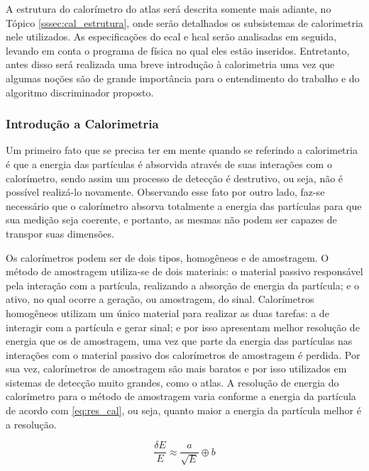A estrutura do calorímetro do \gls{atlas} será descrita somente mais adiante, no Tópico
\ref{sssec:cal_estrutura}, onde serão detalhados os subsistemas de calorimetria
nele utilizados. As especificações do \gls{ecal} e \gls{hcal} serão analisadas em seguida, 
levando em conta o programa de física no qual eles estão inseridos. 
Entretanto, antes disso será realizada uma breve introdução à
calorimetria uma vez que algumas noções são de grande importância para o 
entendimento do trabalho e do algoritmo discriminador proposto.

\subsubsection{Introdução a Calorimetria}
\label{sssec:intro_cal}

Um primeiro fato que se precisa ter em mente quando se referindo a calorimetria
\cite{wigmans,tese_torres} é que a energia das partículas é 
absorvida através de suas interações com o calorímetro, sendo assim um processo 
de detecção é destrutivo, ou seja, não é possível realizá-lo novamente. 
Observando esse fato por outro lado, faz-se necessário que o calorímetro 
absorva totalmente a energia das partículas para que sua medição 
seja coerente, e portanto, as mesmas não podem ser capazes de transpor suas dimensões.

Os calorímetros podem ser de dois tipos, homogêneos e de amostragem. 
O método de amostragem utiliza-se de dois materiais: o material passivo 
responsável pela interação com a partícula, realizando a absorção de energia da
partícula; e o ativo, no qual ocorre a geração, ou amostragem, do sinal. 
Calorímetros homogêneos utilizam um único material para realizar as duas
tarefas: a de interagir com a partícula e gerar sinal; e por isso apresentam melhor resolução de energia 
que os de amostragem, uma vez que parte da energia das partículas nas interações com o
material passivo dos calorímetros de amostragem é perdida. Por sua vez, calorímetros de amostragem são
mais baratos e por isso utilizados em sistemas de detecção muito grandes, como o
\gls{atlas}. A resolução de energia do calorímetro para o método de 
amostragem varia conforme a energia da partícula de acordo com
\ref{eq:res_cal}, ou seja, quanto maior a energia da partícula melhor é a
resolução.

\begin{equation}\label{eq:res_cal}
\frac{\delta E}{E} \approx \frac{a}{\sqrt{E}} \oplus b
\end{equation}

